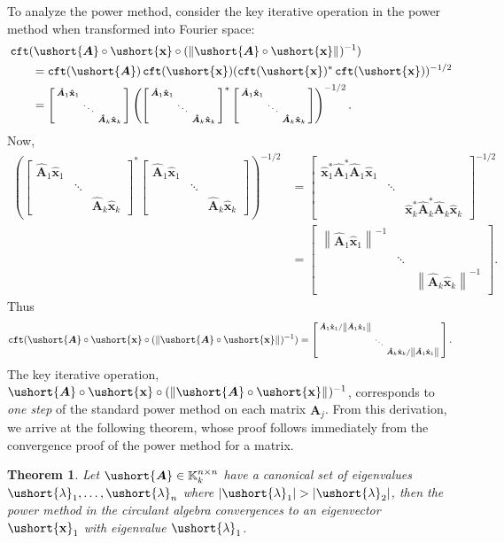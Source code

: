 \documentclass[1p,authoryear,letterpaper]{elsarticle}
\newtheorem{theorem}{Theorem}
\providecommand{\KK}{\mathbb{K}}
\providecommand{\normof}[2][]{\left\| #2 \right\|_{#1}}\providecommand{\nnormof}[2][]{\| #2 \|_{#1}}\providecommand{\itr}[2]{#1^{(#2)}}
\providecommand{\sbmat}[1]{\left[\begin{smallmatrix} #1 \end{smallmatrix}\right]}
\providecommand{\mat}{\boldsymbol}
\renewcommand{\vec}{\mathbf}
\providecommand{\mhat}[1]{\ensuremath{\mat{\hat{#1}}}}
\providecommand{\vhat}[1]{\ensuremath{\vec{\hat{#1}}}}
\providecommand{\mAhat}{\mhat{A}}
\providecommand{\vxhat}{\vhat{x}}
\DeclareMathOperator{\fft}{\texttt{cft}}
\newcommand{\cel}[1]{\ushort{#1}}
\newcommand{\celm}[1]{\cel{\mat{#1}}}
\newcommand{\celv}[1]{\cel{\vec{#1}}}
\newcommand{\clambda}{\ensuremath{\cel{\lambda}}}
\newcommand{\cvx}{\ensuremath{\celv{x}}}
\providecommand{\cmA}{\ensuremath{\celm{A}}}
\begin{document}
To analyze the power
method, consider the key iterative operation in the power method when
transformed into Fourier space:
\[ \begin{aligned}
& \fft( \cmA \circ \cvx \circ (\normof{\cmA \circ \cvx})^{-1} ) \\
& \qquad  = \fft(\cmA) \fft(\cvx) (\fft(\cvx)^* \fft(\cvx))^{-1/2}  \\
& \qquad = \sbmat{\mAhat_1\vxhat_1 \\ & \ddots \\ & & \mAhat_k \vxhat_k}
  \left( \sbmat{\mAhat_1\vxhat_1 \\ & \ddots \\ & & \mAhat_k \vxhat_k}^*
   \sbmat{\mAhat_1\vxhat_1 \\ & \ddots \\ & & \mAhat_k \vxhat_k} \right)^{-1/2}.\\
  \end{aligned} \]
Now,
\[
\begin{aligned}
\left(
  \sbmat{\mAhat_1\vxhat_1 \\ & \ddots \\ & & \mAhat_k \vxhat_k}^*
  \sbmat{\mAhat_1\vxhat_1 \\ & \ddots \\ & & \mAhat_k \vxhat_k}
\right)^{-1/2}
& =
\sbmat{ \vxhat_1^* \mAhat_1^* \mAhat_1 \vxhat_1 \\
        & \ddots \\ & & \vxhat_k^* \mAhat_k^* \mAhat_k \vxhat_k }^{-1/2}
\\ & =
\sbmat{ \normof{\mAhat_1 \vxhat_1}^{-1} \\
        & \ddots \\ & & \normof{\mAhat_k \vxhat_k}^{-1} }.
\end{aligned}
\]
Thus
\[ \fft( \cmA \circ \cvx \circ (\normof{\cmA \circ \cvx})^{-1} )
= \sbmat{\mAhat_1 \vxhat_1 / \normof{\mAhat_1 \vxhat_1} \\
         & \ddots \\
         & & \mAhat_k \vxhat_k / \normof{\mAhat_1 \vxhat_1}}.
\]
The key iterative operation, $\cmA \circ \cvx \circ (\normof{\cmA \circ \cvx})^{-1}$,
 corresponds to  \emph{one step} of the standard power method on each
matrix $\mAhat_j$.  From this derivation, we arrive at the following theorem, whose 
proof follows immediately from the convergence proof of the power method for a matrix.

\begin{theorem}
 Let $\cmA \in \KK_k^{n \times n}$ have a canonical
 set of eigenvalues $\clambda_1, \ldots, \clambda_n$
 where $|\clambda_1| > |\clambda_2|$, then
 the power method in the circulant algebra
 convergences to an eigenvector $\cvx_1$
 with eigenvalue $\clambda_1$.
\end{theorem}
\end{document}
